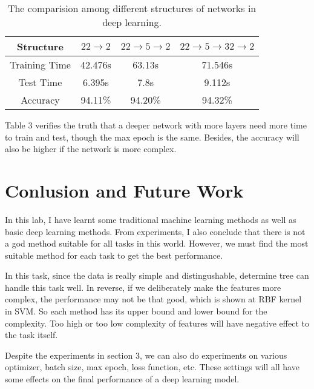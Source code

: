 \documentclass{article}
\begin{document}
\begin{table}[h]
     \centering
     \begin{tabular}{cccc}
         \hline
         Structure & $22\rightarrow 2$  & $22\rightarrow 5\rightarrow 2$ & $22\rightarrow 5 \rightarrow 32 \rightarrow 2$\\
         \hline
         Training Time & 42.476s & 63.13s & 71.546s \\
         Test Time & 6.395s & 7.8s & 9.112s \\
         Accuracy & 94.11\% & 94.20\% & 94.32\% \\
         \hline
     \end{tabular}
     \caption{The comparision among different structures of networks in deep learning.}
\end{table}

Table 3 verifies the truth that a deeper network with more layers need more time to train and test, though the max epoch is the same. Besides, the accuracy will also be higher if the network is more complex.

\section{Conlusion and Future Work}
In this lab, I have learnt some traditional machine learning methods as well as basic deep learning methods. From experiments, I also conclude that there is not a god method suitable for all tasks in this world. However, we must find the most suitable method for each task to get the best performance. 

In this task, since the data is really simple and distingushable, determine tree can handle this task well. In reverse, if we deliberately make the features more complex, the performance may not be that good, which is shown at RBF kernel in SVM. So each method has its upper bound and lower bound for the complexity. Too high or too low complexity of features will have negative effect to the task itself.

Despite the experiments in section 3, we can also do experiments on various optimizer, batch size, max epoch, loss function, etc. These settings will all have some effects on the final performance of a deep learning model.

\end{document}
